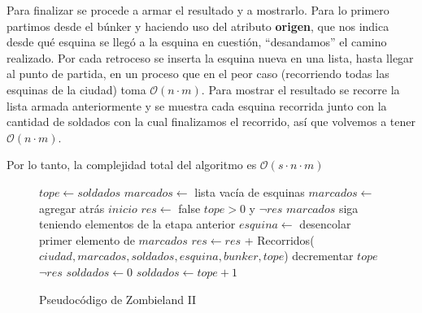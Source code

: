 Para finalizar se procede a armar el resultado y a mostrarlo. Para lo primero partimos desde el búnker y haciendo uso del atributo {\bf origen}, que nos indica desde qué esquina se llegó a la esquina en cuestión, ``desandamos'' el camino realizado. Por cada retroceso se inserta la esquina nueva en una lista, hasta llegar al punto de partida, en un proceso que en el peor caso (recorriendo todas las esquinas de la ciudad) toma $\mathcal{O}(n \cdot m)$. Para mostrar el resultado se recorre la lista armada anteriormente y se muestra cada esquina recorrida junto con la cantidad de soldados con la cual finalizamos el recorrido, así que volvemos a tener $\mathcal{O}(n \cdot m)$.

Por lo tanto, la complejidad total del algoritmo es $\mathcal{O}(s \cdot n \cdot m)$

\begin{figure}[!ht]
\begin{codebox}
\li $tope \leftarrow soldados$
\li $marcados \leftarrow$ lista vacía de esquinas
\li $marcados \leftarrow$ agregar atrás $inicio$
\li $res \leftarrow$ false
\li \While $tope > 0$ y $\neg res$
\li		\Do \While $marcados$ siga teniendo elementos de la etapa anterior
\li				\Do
					$esquina \leftarrow$ desencolar primer elemento de $marcados$
\li					$res \leftarrow res$ + {\sc Recorridos}($ciudad,marcados,soldados,esquina,bunker,tope$)
				\End
\li			decrementar $tope$
		\End
\li	\If $\neg res$
\li		\Do $soldados \leftarrow 0$ \End
\li		\Else 
\li			\Do $soldados \leftarrow tope + 1$
			\End
		\End
\end{codebox} 
\caption{Pseudocódigo de Zombieland II}\label{code:zombieland}
\end{figure}


